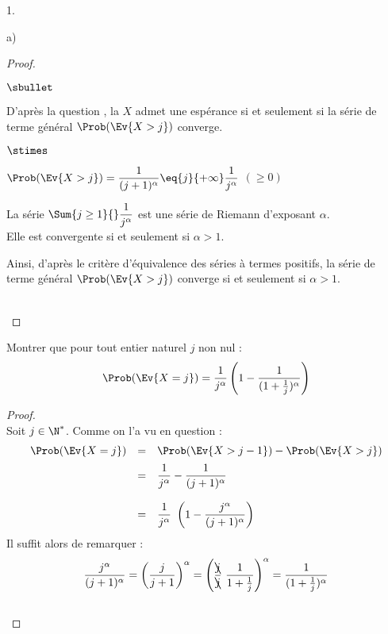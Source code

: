 \begin{noliste}{1.}
\begin{noliste}{a)}
    \begin{proof}~%
      \begin{noliste}{$\sbullet$}
      \item D'après la question , la \var $X$ admet une
        espérance si et seulement si la série de terme général
        $\Prob(\Ev{X > j})$ converge.

      \item
        \begin{noliste}{$\stimes$}
        \item $\Prob(\Ev{X > j}) = \dfrac{1}{(j+1)^\alpha}
          \eq{j}{+\infty} \dfrac{1}{j^\alpha}$ $(\geq 0)$

        \item La série $\Sum{j \geq 1}{} \dfrac{1}{j^\alpha}$ est
          une série de Riemann d'exposant $\alpha$.\\
          Elle est convergente si et seulement si $\alpha > 1$.
        \end{noliste}
        Ainsi, d'après le critère d'équivalence des séries à termes
        positifs, la série de terme général $\Prob(\Ev{X > j})$
        converge si et seulement si $\alpha > 1$.        
      \end{noliste}
      ~\\[-1.2cm]
    \end{proof}

  \item Montrer que pour tout entier naturel $j$ non nul :
    \[
    \Prob(\Ev{X=j}) = \dfrac{1}{j^{\alpha}} \left( 1 -
      \dfrac{1}{(1+\frac{1}{j})^{\alpha}}\right)
    \]
    
    \begin{proof}~\\
      Soit $j \in \N^*$. Comme on l'a vu en question  :
      \[
      \begin{array}{rcl}
        \Prob(\Ev{X = j}) & = & \Prob(\Ev{X > j-1}) - \Prob(\Ev{X >
          j})
        \\[.2cm]
        & = & \dfrac{1}{j^{\alpha}} - \dfrac{1}{(j+1)^{\alpha}} 
        \\[.6cm]
        & = & \dfrac{1}{j^{\alpha}} \ \left( 1 -
          \dfrac{j^\alpha}{(j+1)^{\alpha}} \right)
      \end{array}
      \]
      Il suffit alors de remarquer : 
      \[
      \dfrac{j^\alpha}{(j+1)^{\alpha}} = \left( \dfrac{j}{j+1}
      \right)^\alpha = \left(\dfrac{\bcancel{j}}{\bcancel{j}} \
        \dfrac{1}{1+\frac{1}{j}} \right)^\alpha = \dfrac{1}{(1 +
        \frac{1}{j})^\alpha}
      \]
      ~\\[-1cm]
    \end{proof}


\end{noliste}
\end{noliste}
